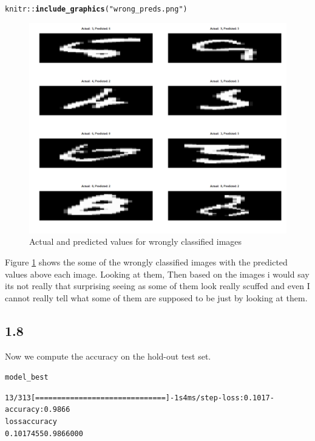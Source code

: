 \documentclass[10pt, a4paper, english]{article}\usepackage[]{graphicx}\usepackage[dvipsnames]{xcolor}
\makeatletter
\def\maxwidth{ %
  \ifdim\Gin@nat@width>\linewidth
    \linewidth
  \else
    \Gin@nat@width
  \fi
}
\newcommand{\hlstr}[1]{\textcolor[rgb]{0.192,0.494,0.8}{#1}}%
\newcommand{\hlopt}[1]{\textcolor[rgb]{0,0,0}{#1}}%
\newcommand{\hlstd}[1]{\textcolor[rgb]{0.345,0.345,0.345}{#1}}%
\newcommand{\hlkwd}[1]{\textcolor[rgb]{0.737,0.353,0.396}{\textbf{#1}}}%
\newenvironment{kframe}{%
 \def\at@end@of@kframe{}%
 \ifinner\ifhmode%
  \def\at@end@of@kframe{\end{minipage}}%
  \begin{minipage}{\columnwidth}%
 \fi\fi%
 \def\FrameCommand##1{\hskip\@totalleftmargin \hskip-\fboxsep
 \colorbox{shadecolor}{##1}\hskip-\fboxsep
     \hskip-\linewidth \hskip-\@totalleftmargin \hskip\columnwidth}%
 \MakeFramed {\advance\hsize-\width
   \@totalleftmargin\z@ \linewidth\hsize
   \@setminipage}}%
 {\par\unskip\endMakeFramed%
 \at@end@of@kframe}
\newenvironment{knitrout}{}{} %
\makeatother
\begin{document}
\begin{knitrout}
\color{fgcolor}\begin{kframe}
\begin{alltt}
\hlstd{knitr}\hlopt{::}\hlkwd{include_graphics}\hlstd{(}\hlstr{"wrong_preds.png"}\hlstd{)}
\end{alltt}
\end{kframe}\begin{figure}
\includegraphics[width=\maxwidth]{wrong_preds} \caption[Actual and predicted values for wrongly classified images]{Actual and predicted values for wrongly classified images}\label{fig:preds}
\end{figure}

\end{knitrout}

Figure \ref{fig:preds} shows the some of the wrongly classified images with the predicted values above each image. Looking at them, Then based on the images i would say its not really that surprising seeing as some of them look really scuffed and even I cannot really tell what some of them are supposed to be just by looking at them.

\subsection{1.8}
Now we compute the accuracy on the hold-out test set.
\begin{knitrout}
\color{fgcolor}\begin{kframe}
\begin{alltt}
model_best %

13/313 [==============================] - 1s 4ms/step - loss: 0.1017 - accuracy: 0.9866
     loss  accuracy 
0.1017455 0.9866000 
\end{alltt}
\end{kframe}
\end{knitrout}
\end{document}
